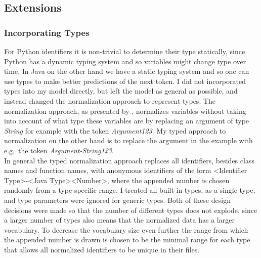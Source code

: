 \documentclass[11pt]{article}
\begin{document}
\subsection{Extensions}
\label{extensions}
\subsubsection{Incorporating Types}
\label{incorporating_types}
For Python identifiers it is non-trivial to determine their type statically, since Python has a dynamic typing system and so variables might change type over time.
In Java on the other hand we have a static typing system and so one can use types to make better predictions of the next token. I did not incorporated types into my model directly, but left the model as general as possible, and instead changed the normalization approach to represent types.
The normalization approach, as presented by \cite{bhoopchand2016learning},  normalizes variables without taking into account of what type these variables are by replacing an argument of type \textit{String} for example with the token \textit{Argument123}. My typed approach to normalization on the other hand is to replace the argument in the example with e.g.\ the token \textit{Argument-String123}.\\
In general the typed normalization approach replaces all identifiers, besides class names and function names, with anonymous identifiers of the form <Identifier Type>-<Java Type><Number>, where the appended number is chosen randomly from a type-specific range. I treated all built-in types, as a single type, and type parameters were ignored for generic types. Both of these design decisions were made so that the number of different types does not explode, since a larger number of types also means that the normalized data has a larger vocabulary. To decrease the vocabulary size even further the range from which the appended number is drawn is chosen to be the minimal range for each type that allows all normalized identifiers to be unique in their files.
\end{document}
